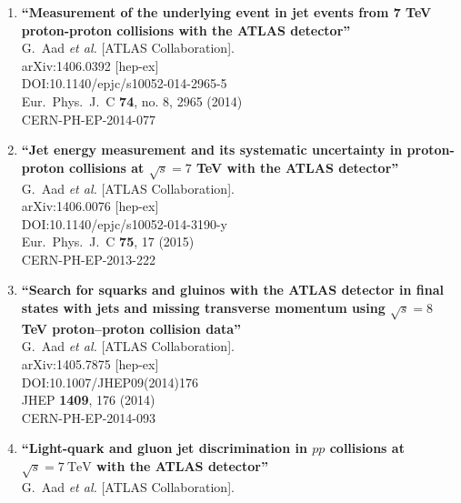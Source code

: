 \documentclass{article}
\begin{document}
\begin{enumerate}
\item%
{\bf ``Measurement of the underlying event in jet events from 7 TeV proton-proton collisions with the ATLAS detector''}
  \\{}G.~Aad {\it et al.} [ATLAS Collaboration].
  \\{}arXiv:1406.0392 [hep-ex]
  \\{}DOI:10.1140/epjc/s10052-014-2965-5
  \\{}Eur.\ Phys.\ J.\ C {\bf 74}, no. 8, 2965 (2014)
  \\{}CERN-PH-EP-2014-077
\item%
{\bf ``Jet energy measurement and its systematic uncertainty in proton-proton collisions at $\sqrt{s}=7$ TeV with the ATLAS detector''}
  \\{}G.~Aad {\it et al.} [ATLAS Collaboration].
  \\{}arXiv:1406.0076 [hep-ex]
  \\{}DOI:10.1140/epjc/s10052-014-3190-y
  \\{}Eur.\ Phys.\ J.\ C {\bf 75}, 17 (2015)
  \\{}CERN-PH-EP-2013-222
\item%
{\bf ``Search for squarks and gluinos with the ATLAS detector in final states with jets and missing transverse momentum using $\sqrt{s}=8$ TeV proton--proton collision data''}
  \\{}G.~Aad {\it et al.} [ATLAS Collaboration].
  \\{}arXiv:1405.7875 [hep-ex]
  \\{}DOI:10.1007/JHEP09(2014)176
  \\{}JHEP {\bf 1409}, 176 (2014)
  \\{}CERN-PH-EP-2014-093
\item%
{\bf ``Light-quark and gluon jet discrimination in $pp$ collisions at $\sqrt{s}=7\mathrm {\ TeV}$ with the ATLAS detector''}
  \\{}G.~Aad {\it et al.} [ATLAS Collaboration].

\end{enumerate}
\end{document}
